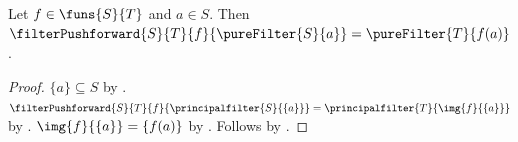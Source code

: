 \begin{corollary}\label{pure_filter_pushforward}
    Let $f\in\funs{S}{T}$ and $a\in S$.
    Then $\filterPushforward{S}{T}{f}{\pureFilter{S}{a}}
        =\pureFilter{T}{f(a)}$.
\end{corollary}
\begin{proof}
    $\{a\}\subseteq S$ by .
    $\filterPushforward{S}{T}{f}{\principalfilter{S}{\{a\}}}
        =\principalfilter{T}{\img{f}{\{a\}}}$ by
        .
    $\img{f}{\{a\}}=\{f(a)\}$ by .
    Follows by .
\end{proof}
